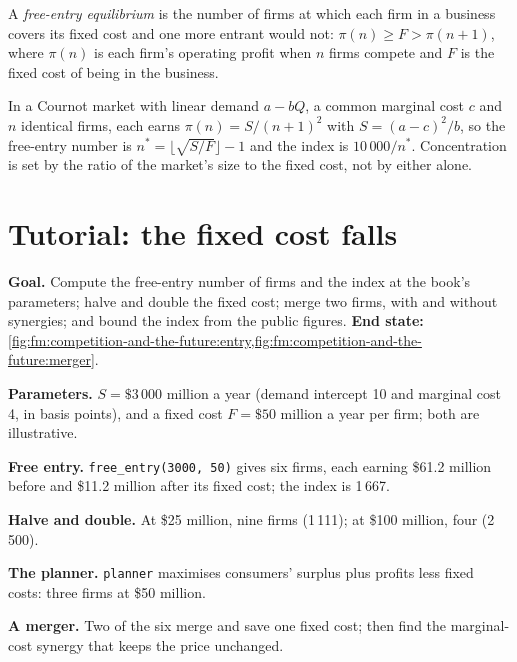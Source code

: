\begin{definition}\label{def:fm:competition-and-the-future:freeentry}
A \emph{free-entry equilibrium} is the number of firms at which each firm in a business covers its fixed cost and one
more entrant would not: $\pi(n)\ge F>\pi(n+1)$, where $\pi(n)$ is each firm's operating profit when $n$ firms compete and $F$ is the fixed cost of
being in the business.
\end{definition}

In a Cournot market with linear demand $a-bQ$, a common marginal cost $c$ and $n$ identical firms, each earns $\pi(n)=S/(n+1)^2$ with
$S=(a-c)^2/b$, so the free-entry number is $n^*=\lfloor\sqrt{S/F}\rfloor-1$ and the index is $10\,000/n^*$. Concentration is set by the ratio of the
market's size to the fixed cost, not by either alone.

\section{Tutorial: the fixed cost falls}\label{tut:fm:competition-and-the-future:tut}

\begin{tutorial}
\textbf{Goal.} Compute the free-entry number of firms and the index at the book's parameters; halve and double the fixed cost; merge two firms, with
and without synergies; and bound the index from the public figures. \textbf{End state:}
\cref{fig:fm:competition-and-the-future:entry,fig:fm:competition-and-the-future:merger}.
\begin{tutsteps}
\item \textbf{Parameters.} $S=\$3\,000$ million a year (demand intercept 10 and marginal cost 4, in basis points), and a fixed cost $F=\$50$ million
a year per firm; both are illustrative.
\item \textbf{Free entry.} \texttt{free\_entry(3000, 50)} gives six firms, each earning \$61.2 million before and \$11.2 million after its fixed cost;
the index is 1\,667.
\item \textbf{Halve and double.} At \$25 million, nine firms (1\,111); at \$100 million, four (2\,500).
\item \textbf{The planner.} \texttt{planner} maximises consumers' surplus plus profits less fixed costs: three firms at \$50 million.
\item \textbf{A merger.} Two of the six merge and save one fixed cost; then find the marginal-cost synergy that keeps the price unchanged.
\end{tutsteps}
\end{tutorial}

